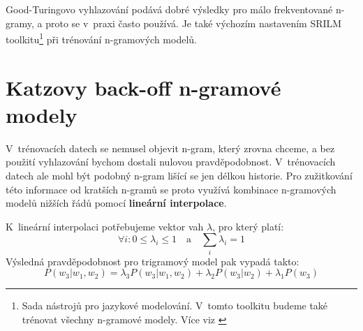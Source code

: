 \documentclass[12pt,a4paper]{report}
\begin{document}


Good-Turingovo vyhlazování podává dobré výsledky pro málo frekventované n-gramy, a proto se v~praxi často používá. Je také výchozím nastavením SRILM toolkitu\footnote{Sada nástrojů pro jazykové modelování. V~tomto toolkitu budeme také trénovat všechny n-gramové modely. Více viz \cite{srilm}} při trénování n-gramových modelů.


\section{Katzovy back-off n-gramové modely}
V~trénovacích datech se nemusel objevit n-gram, který zrovna chceme, a bez použití vyhlazování bychom dostali nulovou pravděpodobnost. V~trénovacích datech ale mohl být podobný n-gram lišící se jen délkou historie. Pro zužitkování této informace od kratších n-gramů se proto využívá kombinace n-gramových modelů nižších řádů pomocí \textbf{lineární interpolace}. 

K~lineární interpolaci potřebujeme vektor vah $\lambda$, pro který platí:
\begin{equation}
\forall i : 0 \leq \lambda_i \leq 1 \quad \text{a} \quad \sum_{i} \lambda_i = 1
\end{equation}
Výsledná pravděpodobnost pro trigramový model pak vypadá takto:
\begin{equation}
P(w_3|w_1, w_2) = \lambda_3 P(w_3|w_1,w_2) + \lambda_2 P(w_3|w_2) + \lambda_1 P(w_3)
\end{equation}
\end{document}
